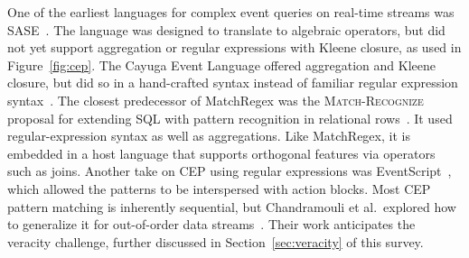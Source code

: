 One of the earliest languages for complex event queries on real-time
streams was \textsf{SASE}~\cite{WuDR06}. The language was designed to translate
to algebraic operators, but did not yet support aggregation or regular
expressions with Kleene closure, as used in Figure~\ref{fig:cep}.
The Cayuga Event Language offered aggregation and Kleene closure, but
did so in a hand-crafted syntax instead of familiar regular expression
syntax~\cite{demers_et_al_2007}.
The closest predecessor of MatchRegex was the \textsc{Match-Recognize}
proposal for extending SQL with pattern recognition in relational
rows~\cite{zemke_et_al_2007}. It used regular-expression syntax as
well as aggregations. Like MatchRegex, it is embedded in a host
language that supports orthogonal features via operators such as
joins.
Another take on CEP using regular expressions was
\textsf{EventScript}~\cite{cohen_kalleberg_2008}, which allowed the patterns to
be interspersed with action blocks.
Most CEP pattern matching is inherently sequential, but Chandramouli et
al.\ explored how to generalize it for out-of-order data
streams~\cite{chandramouli_goldstein_maier_2010}. Their work
anticipates the veracity challenge, further discussed in
Section~\ref{sec:veracity} of this survey.
